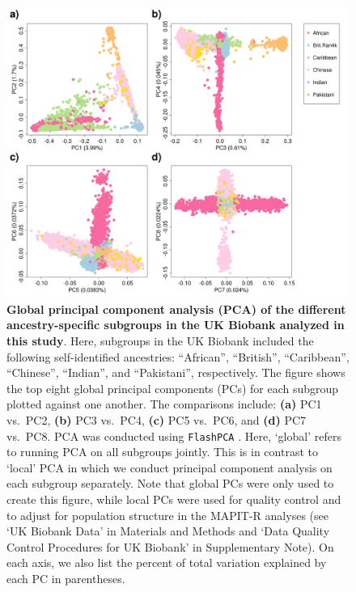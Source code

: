 \documentclass[10pt]{article}
\begin{document}
\begin{figure}[H]
\centering
\includegraphics[width = \textwidth]{Images/Supp/InterPath_Supp_Figure_UKB_PCAPlot_vs2.png}
\caption{\textbf{Global principal component analysis (PCA) of the different ancestry-specific subgroups in the UK Biobank analyzed in this study}. Here, subgroups in the UK Biobank included the following self-identified ancestries: ``African'', ``British'', ``Caribbean'', ``Chinese'', ``Indian'', and ``Pakistani'', respectively. The figure shows the top eight global principal components (PCs) for each subgroup plotted against one another. The comparisons include: \textbf{(a)} PC1 vs.~PC2, \textbf{(b)} PC3 vs.~PC4, \textbf{(c)} PC5 vs.~PC6, and \textbf{(d)} PC7 vs.~PC8. PCA was conducted using \texttt{FlashPCA} \cite{Abraham2017}. Here, `global' refers to running PCA on all subgroups jointly. This is in contrast to `local' PCA in which we conduct principal component analysis on each subgroup separately. Note that global PCs were only used to create this figure, while local PCs were used for quality control and to adjust for population structure in the MAPIT-R analyses (see `UK Biobank Data' in Materials and Methods and `Data Quality Control Procedures for UK Biobank' in Supplementary Note). On each axis, we also list the percent of total variation explained by each PC in parentheses.}
\label{InterPath-Supp-Figure-UKB-subgroups-PCAPlot}
\end{figure}
\clearpage
\end{document}
